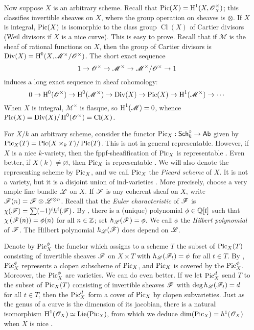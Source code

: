 \documentclass{article}
\begin{document}
Now suppose $X$ is an arbitrary scheme. Recall that 
$\operatorname{Pic}(X)=\operatorname{H}^1(X,\mathscr{O}_X^\times)$; this classifies invertible sheaves on 
$X$, where the group operation on sheaves is $\otimes$. If $X$ is integral, 
$\operatorname{Pic}(X)$ is isomorphic to the class group $\operatorname{Cl}(X)$ of Cartier 
divisors (Weil divisors if $X$ is a nice curve). This is easy to prove. Recall 
that if $\mathscr{M}$ is the sheaf of rational functions on $X$, then the 
group of Cartier divisors is $\operatorname{Div}(X) = \operatorname{H}^0(X,\mathscr{M}^\times/\mathscr{O}^\times)$. 
The short exact sequence 
\[
  1 \to \mathscr{O}^\times \to \mathscr{M}^\times\to \mathscr{M}^\times/\mathscr{O}^\times \to 1
\]
induces a long exact sequence in sheaf cohomology:
\[
  0 \to \operatorname{H}^0(\mathscr{O}^\times) \to \operatorname{H}^0(\mathscr{M}^\times) \to \operatorname{Div}(X) \to \operatorname{Pic}(X) \to \operatorname{H}^1(\mathscr{M}^\times) \to \cdots
\]
When $X$ is integral, $\mathscr{M}^\times$ is flasque, so 
$\operatorname{H}^1(\mathscr{M}) = 0$, whence 
$\operatorname{Pic}(X)=\operatorname{Div}(X)/\operatorname{H}^0(\mathscr{O}^\times) = \operatorname{Cl}(X)$. 

For $X/k$ an arbitrary scheme, consider the functor 
$\operatorname{Pic}_X:\mathsf{Sch}_k^\circ\to\mathsf{Ab}$ given by 
$\operatorname{Pic}_X(T) = \operatorname{Pic}(X\times_k T)/\operatorname{Pic}(T)$. This is not in general 
representable. However, if $X$ is a nice $k$-variety, then the 
fppf-sheafification of $\operatorname{Pic}_X$ is representable \cite[4.1.38]{kl05}. Even 
better, if $X(k)\ne\varnothing$, then $\operatorname{Pic}_X$ is representable 
\cite[2.5]{kl05}. We will also denote the representing scheme by $\operatorname{Pic}_X$, and 
we call $\operatorname{Pic}_X$ the \emph{Picard scheme} of $X$. It is not a variety, but it 
is a disjoint union of ind-varieties \cite[4.8]{kl05}. More precisely, choose 
a very ample line bundle $\mathscr{L}$ on $X$. If $\mathscr{F}$ is any coherent 
sheaf on $X$, write 
$\mathscr{F}(n) = \mathscr{F}\otimes\mathscr{L}^{\otimes n}$. Recall that the 
\emph{Euler characteristic} of $\mathscr{F}$ is 
$\chi(\mathscr{F}) = \sum (-1)^i h^i(\mathscr{F})$. By \cite[2.5.3]{gr61}, 
there is a (unique) polynomial $\phi\in \mathbb{Q}[t]$ such that 
$\chi\left(\mathscr{F}(n)\right) = \phi(n)$ for all 
$n\in\mathbb{Z}$; set $h_{\mathscr{L}}(\mathscr{F}) = \phi$. We call $\phi$ the 
\emph{Hilbert polynomial} of $\mathscr{F}$. The Hilbert polynomial 
$h_{\mathscr{L}}(\mathscr{F})$ does depend on $\mathscr{L}$.

Denote by 
$\operatorname{Pic}_X^\phi$ the functor which assigns to a scheme $T$ the subset of 
$\operatorname{Pic}_X(T)$ consisting of invertible sheaves $\mathscr{F}$ on $X\times T$ with 
$h_{\mathscr{L}}(\mathscr{F}_t) = \phi$ for all $t\in T$. By \cite[6.20]{kl05}, 
$\operatorname{Pic}_X^\phi$ represents a clopen subscheme of $\operatorname{Pic}_X$, and $\operatorname{Pic}_X$ is 
covered by the $\operatorname{Pic}_X^\phi$. Moreover, the $\operatorname{Pic}_X^\phi$ are varieties. We can 
do even better. If we let $\operatorname{Pic}_X^d$ send $T$ to the subset of $\operatorname{Pic}_X(T)$ 
consisting of invertible sheaves $\mathscr{F}$ with 
$\deg h_{\mathscr{L}}(\mathscr{F}_t) = d$ for all $t\in T$, then the 
$\operatorname{Pic}_X^d$ form a cover of $\operatorname{Pic}_X$ by clopen subvarieties. Just as the genus 
of a curve is the dimension of its jacobian, there is a natural isomorphism 
$\operatorname{H}^1(\mathscr{O}_X) \simeq \operatorname{Lie}(\operatorname{Pic}_X)$, from which we deduce 
$\dim(\operatorname{Pic}_X) = h^1(\mathscr{O}_X)$ when $X$ is nice \cite[5.11]{kl05}.
\end{document}
